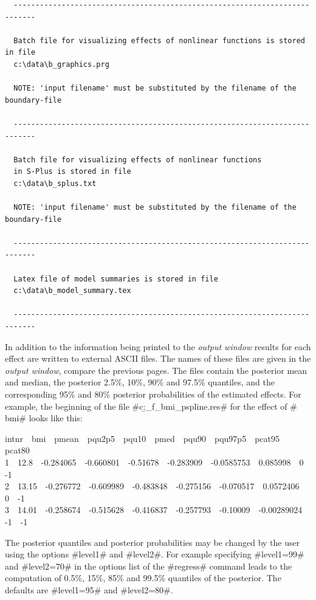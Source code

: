 \documentclass[11pt,a4paper,twoside]{bayesxreport}
\begin{document}
\begin{verbatim}
  ---------------------------------------------------------------------------

  Batch file for visualizing effects of nonlinear functions is stored in file
  c:\data\b_graphics.prg

  NOTE: 'input filename' must be substituted by the filename of the boundary-file

  ---------------------------------------------------------------------------

  Batch file for visualizing effects of nonlinear functions
  in S-Plus is stored in file
  c:\data\b_splus.txt

  NOTE: 'input filename' must be substituted by the filename of the boundary-file

  ---------------------------------------------------------------------------

  Latex file of model summaries is stored in file
  c:\data\b_model_summary.tex

  ---------------------------------------------------------------------------
\end{verbatim}
\normalsize

In addition to the information being printed to the {\em output
window} results for each effect are written to external ASCII files.
The names of these files are given in the {\em output window},
compare the previous pages. The files contain the posterior mean and
median, the posterior 2.5\%, 10\%, 90\% and 97.5\% quantiles, and
the corresponding 95\% and 80\% posterior probabilities of the
estimated effects. For example, the beginning of the file
#c:\data\b_f_bmi_pspline.res# for the effect of # bmi# looks like
this:

{\footnotesize
 intnr \,\, bmi \,\, pmean \,\, pqu2p5 \,\, pqu10 \,\, pmed \,\, pqu90 \,\, pqu97p5 \,\, pcat95 \,\, pcat80\\
 1 \,\, 12.8 \,\, -0.284065 \,\, -0.660801 \,\, -0.51678 \,\, -0.283909 \,\, -0.0585753 \,\, 0.085998 \,\, 0 \,\, -1\\
 2 \,\, 13.15 \,\, -0.276772 \,\, -0.609989 \,\, -0.483848 \,\, -0.275156 \,\, -0.070517 \,\, 0.0572406 \,\, 0 \,\, -1\\
 3 \,\, 14.01 \,\, -0.258674 \,\, -0.515628 \,\, -0.416837 \,\, -0.257793 \,\, -0.10009 \,\, -0.00289024 \,\, -1 \,\, -1}

The posterior quantiles and posterior probabilities may be changed
by the user using the options #level1# and #level2#. For example
specifying #level1=99# and #level2=70# in the options list of the
#regress# command leads to the computation of 0.5\%, 15\%, 85\% and
99.5\% quantiles of the posterior. The defaults are #level1=95# and
#level2=80#.
\end{document}
